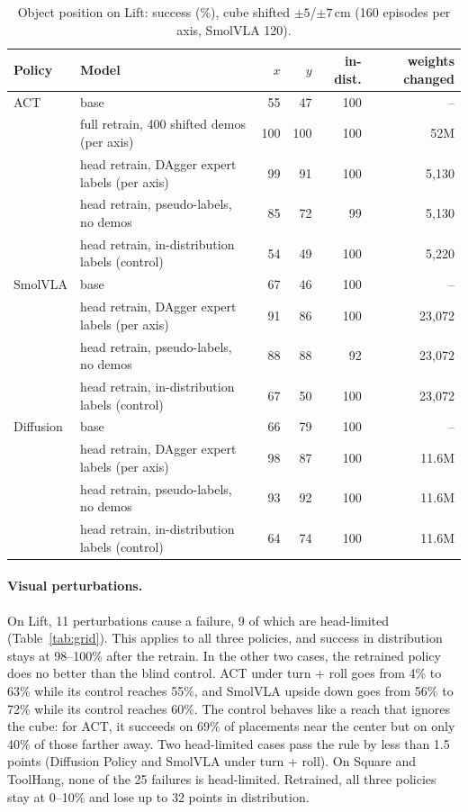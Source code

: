 \documentclass[10pt]{article}
\begin{document}
\begin{table}[t]
\centering
\caption{Object position on Lift: success (\%), cube shifted $\pm5$/$\pm7$\,cm (160 episodes per axis, SmolVLA 120).}
\label{tab:position}
\footnotesize
\begin{tabular}{llrrrr}
\toprule
Policy & Model & $x$ & $y$ & in-dist. & weights changed\\
\midrule
ACT & base & 55 & 47 & 100 & --\\
 & full retrain, 400 shifted demos (per axis) & 100 & 100 & 100 & 52M\\
 & head retrain, DAgger expert labels (per axis) & 99 & 91 & 100 & 5{,}130\\
 & head retrain, pseudo-labels, no demos & 85 & 72 & 99 & 5{,}130\\
 & head retrain, in-distribution labels (control) & 54 & 49 & 100 & 5{,}220\\
\midrule
SmolVLA & base & 67 & 46 & 100 & --\\
 & head retrain, DAgger expert labels (per axis) & 91 & 86 & 100 & 23{,}072\\
 & head retrain, pseudo-labels, no demos & 88 & 88 & 92 & 23{,}072\\
 & head retrain, in-distribution labels (control) & 67 & 50 & 100 & 23{,}072\\
\midrule
Diffusion & base & 66 & 79 & 100 & --\\
 & head retrain, DAgger expert labels (per axis) & 98 & 87 & 100 & 11.6M\\
 & head retrain, pseudo-labels, no demos & 93 & 92 & 100 & 11.6M\\
 & head retrain, in-distribution labels (control) & 64 & 74 & 100 & 11.6M\\
\bottomrule
\end{tabular}
\end{table}

\paragraph{Visual perturbations.} On Lift, 11 perturbations cause a failure, 9 of which are
head-limited (Table~\ref{tab:grid}). This applies to all three policies, and
success in distribution stays at 98--100\% after the retrain. In the other two cases, the retrained
policy does no better than the blind control. ACT under turn + roll goes from 4\% to 63\% while its
control reaches 55\%, and SmolVLA upside down goes from 56\% to 72\% while its control reaches 60\%. The
control behaves like a reach that ignores the cube: for ACT, it succeeds on 69\% of placements near the
center but on only 40\% of those farther away. Two head-limited cases pass the rule
by less than 1.5 points (Diffusion Policy and SmolVLA under turn + roll). On Square and ToolHang, none of
the 25 failures is head-limited. Retrained, all three policies stay at 0--10\% and lose up to 32 points in distribution.
\end{document}
